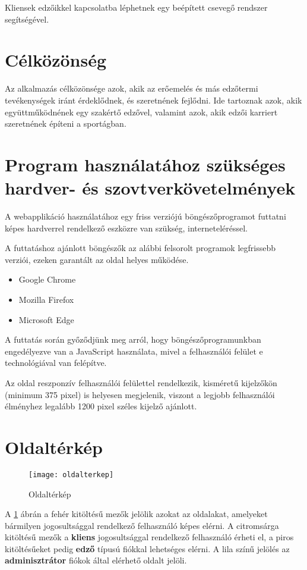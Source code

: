 Kliensek edzőikkel kapcsolatba léphetnek egy beépített csevegő rendszer segítségével.

\section{Célközönség}

Az alkalmazás célközönsége azok, akik az erőemelés és más edzőtermi tevékenységek iránt érdeklődnek, és szeretnének fejlődni. Ide tartoznak azok, akik együttműködnének egy szakértő edzővel, valamint azok, akik edzői karriert szeretnének építeni a sportágban.

\section{Program használatához szükséges hardver- és szovtverkövetelmények}

A webapplikáció használatához egy friss verziójú böngészőprogramot futtatni képes hardverrel rendelkező eszközre van szükség, interneteléréssel.

A futtatáshoz ajánlott böngészők az alábbi felsorolt programok legfrissebb verziói, ezeken garantált az oldal helyes működése.
\begin{itemize}
  \item Google Chrome
  \item Mozilla Firefox
  \item Microsoft Edge
\end{itemize}

\bigskip

A futtatás során győződjünk meg arról, hogy böngészőprogramunkban engedélyezve van a JavaScript használata, mivel a felhasználói felület e technológiával van felépítve.

Az oldal reszponzív felhasználói felülettel rendelkezik, kisméretű kijelzőkön (minimum 375 pixel) is helyesen megjelenik, viszont a legjobb felhasználói élményhez legalább 1200 pixel széles kijelző ajánlott.

\section{Oldaltérkép}

\begin{figure}[H]
	\centering
	\texttt{[image: oldalterkep]}
	\caption{Oldaltérkép}
	\label{fig:oldalterkep}
\end{figure}

A \ref{fig:oldalterkep} ábrán a fehér kitöltésű mezők jelölik azokat az oldalakat, amelyeket bármilyen jogosultsággal rendelkező felhasználó képes elérni.
A citromsárga kitöltésű mezők a \textbf{kliens} jogosultsággal rendelkező felhasználó érheti el, a piros kitöltésűeket pedig \textbf{edző} típusú fiókkal lehetséges elérni.
A lila színű jelölés az \textbf{adminisztrátor} fiókok által elérhető oldalt jelöli.

